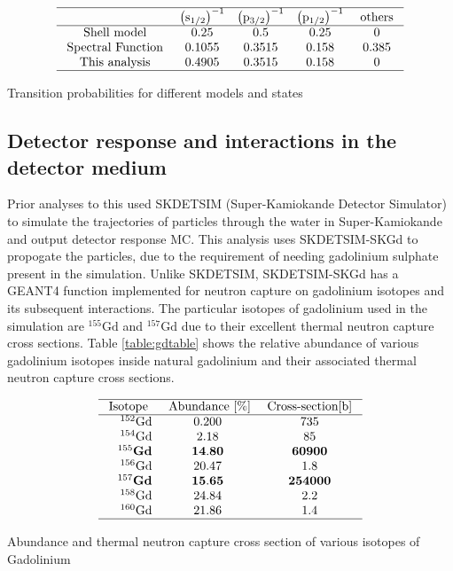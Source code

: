\begin{table}
$$
\begin{array}{ccccc}
\hline & \left(\mathrm{s}_{1 / 2}\right)^{-1} & \left(\mathrm{p}_{3 / 2}\right)^{-1} & \left(\mathrm{p}_{1 / 2}\right)^{-1} & \text { others } \\
\hline \text { Shell model } & 0.25 & 0.5 & 0.25 & 0 \\
\text { Spectral Function } & 0.1055 & 0.3515 & 0.158 & 0.385 \\
\text { This analysis } & 0.4905 & 0.3515 & 0.158 & 0 \\
\hline
\end{array}
$$
\caption{Transition probabilities for different models and states}
\label{table:transitionprob}
\end{table}

\subsection{Detector response and interactions in the detector medium}

Prior analyses to this used SKDETSIM (Super-Kamiokande Detector Simulator) to simulate the trajectories of particles through the water in Super-Kamiokande and output detector response MC. This analysis uses SKDETSIM-SKGd to propogate the particles, due to the requirement of needing gadolinium sulphate present in the simulation. Unlike SKDETSIM, SKDETSIM-SKGd has a GEANT4 function implemented for neutron capture on gadolinium isotopes and its subsequent interactions. The particular isotopes of gadolinium used in the simulation are ${ }^{155} \mathrm{Gd}$ and ${ }^{157} \mathrm{Gd}$ due to their excellent thermal neutron capture cross sections. Table \ref{table:gdtable} shows the relative abundance of various gadolinium isotopes inside natural gadolinium and their associated thermal neutron capture cross sections.

\begin{table}
$$
\begin{array}{rcc}
\hline \text { Isotope } & \text { Abundance }[\%] & \text { Cross-section[b] } \\
\hline{ }^{152} \mathrm{Gd} & 0.200 & 735 \\
{ }^{154} \mathrm{Gd} & 2.18 & 85 \\
{ }^{155} \mathbf{Gd} & \mathbf{1 4 . 8 0} & \mathbf{6 0 9 0 0} \\
{ }^{156} \mathrm{Gd} & 20.47 & 1.8 \\
{ }^{157} \mathbf{Gd} & \mathbf{1 5 . 6 5} & \mathbf{2 5 4 0 0 0} \\
{ }^{158} \mathrm{Gd} & 24.84 & 2.2 \\
{ }^{160} \mathrm{Gd} & 21.86 & 1.4 \\
\hline
\end{array}
$$
\caption{Abundance and thermal neutron capture cross section of various isotopes of Gadolinium}
\label{table:gdtable}
\end{table}


